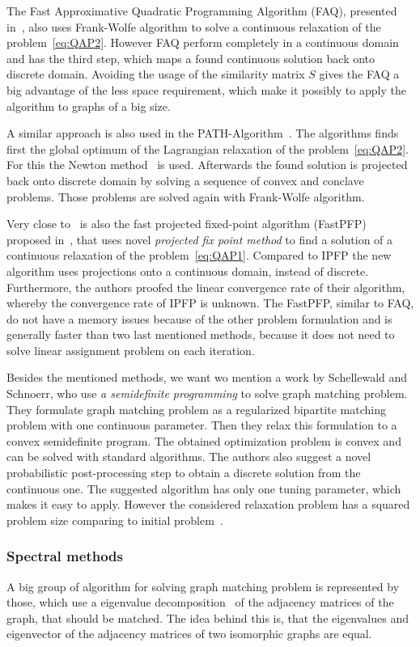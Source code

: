 The Fast Approximative Quadratic Programming Algorithm (FAQ), presented in~\cite{Vogelstein_BrainGraphs}, also uses Frank-Wolfe algorithm to solve a continuous relaxation of the problem~\eqref{eq:QAP2}. However FAQ perform completely in a continuous domain and has the third step, which maps a found continuous solution back onto discrete domain. Avoiding the usage of the similarity matrix $S$ gives the FAQ a big advantage of the less space requirement, which make it possibly to apply the algorithm to graphs of a big size. 

A similar approach is also used in the PATH-Algorithm~\cite{Zaslavskiy2010}. The algorithms finds first the global optimum of the Lagrangian relaxation of the problem~\eqref{eq:QAP2}. For this the Newton method~\cite{Book_ConvOpt} is used. Afterwards the found solution is projected back onto discrete domain by solving a sequence of convex and conclave problems. Those problems are solved again with Frank-Wolfe algorithm.

Very close to~\cite{Leordeanu2009_IPFP} is also the fast projected fixed-point algorithm (FastPFP) proposed in~\cite{FastPFP}, that uses novel \emph{projected fix point method} to find a solution of a continuous relaxation of the problem~\eqref{eq:QAP1}. Compared to IPFP the new algorithm uses projections onto a continuous domain, instead of discrete. Furthermore, the authors proofed the linear convergence rate of their algorithm, whereby the convergence rate of IPFP is unknown. The FastPFP, similar to FAQ, do not have a memory issues because of the other problem formulation and is generally faster than two last mentioned methods, because it does not need to solve linear assignment problem on each iteration.

Besides the mentioned methods, we want wo mention a work by Schellewald and Schnoerr, who use \emph{a semidefinite programming} to solve graph matching problem. They formulate graph matching problem as a regularized bipartite matching problem with one continuous parameter. Then they relax this formulation to a convex semidefinite program. The obtained optimization problem is convex and can be solved with standard algorithms. The authors also suggest a novel probabilistic post-processing step to obtain a discrete solution from the continuous one. The suggested algorithm has only one tuning parameter, which makes it easy to apply. However the considered relaxation problem has a squared problem size comparing to initial problem~\cite{Cour2006}.

\subsubsection{Spectral methods}
A big group of algorithm for solving graph matching problem is represented by those, which use a eigenvalue decomposition~\cite{Book_ConvOpt} of the adjacency matrices of the graph, that should be matched. The idea behind this is, that the eigenvalues and eigenvector of the adjacency matrices of two isomorphic graphs are equal.

